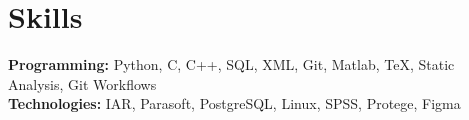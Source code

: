 \documentclass{../templates/simplecv}
\begin{document}
\section{Skills}
\vspace{3pt}
\resumeSubHeadingListStart
\small{\item{
    \textbf{Programming: }{Python, C, C++, SQL, XML, Git, Matlab, TeX, Static Analysis, Git Workflows} \\ \vspace{3pt}
    \textbf{Technologies: }{IAR, Parasoft, PostgreSQL, Linux, SPSS, Protege, Figma}
}}
\resumeSubHeadingListEnd
\end{document}
